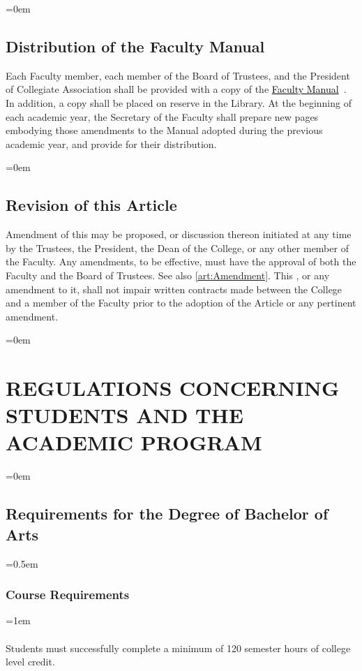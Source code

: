\documentclass{manual}
\let\stdsection\section %
\renewcommand\section{\newpage\stdsection}
\newcommand{\keyword}[1]{\textcolor{black}{#1}}
\newcommand{\facman}{\keyword{\underline{Faculty Manual}}~}
\let\oldsection\section
\renewcommand\section{\leftskip=0em\oldsection}
\let\oldsubsection\subsection
\renewcommand\subsection{\leftskip=0em\oldsubsection}
\let\oldsubsubsection\subsubsection
\renewcommand\subsubsection{\leftskip=0.5em\oldsubsubsection}
\let\oldparagraph\paragraph
\renewcommand\paragraph{\leftskip=1em\oldparagraph}
\begin{document}
\subsection{Distribution of the Faculty Manual}
Each Faculty member, each member of the Board of Trustees, and the President of Collegiate Association shall be provided with a copy of the \facman. In addition, a copy shall be placed on reserve in the Library. At the beginning of each academic year, the Secretary of the Faculty shall prepare new pages embodying those amendments to the Manual adopted during the previous academic year, and provide for their distribution.

\subsection{Revision of this Article}\label{sec:Revision}
Amendment of this  may be proposed, or discussion thereon initiated at any time by the Trustees, the President, the Dean of the College, or any other member of the Faculty. Any amendments, to be effective, must have the approval of both the Faculty and the Board of Trustees. See also \cref{art:Amendment}. This , or any amendment to it, shall not impair written contracts made between the College and a member of the Faculty prior to the adoption of the Article or any pertinent amendment.

\section{REGULATIONS CONCERNING STUDENTS AND THE ACADEMIC PROGRAM}\label{art:RegulationsConcerningStudentStatus}

\subsection{Requirements for the Degree of Bachelor of Arts}

\subsubsection{Course Requirements}

\paragraph{} Students must successfully complete a minimum of 120 semester hours of college level credit.
\end{document}
